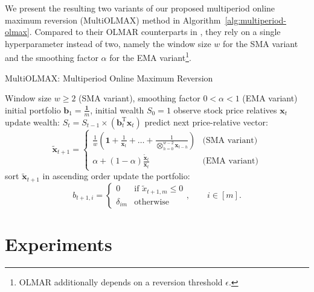 We present the resulting two variants of our proposed multiperiod online maximum reversion (MultiOLMAX) method in Algorithm~\ref{alg:multiperiod-olmax}. Compared to their OLMAR counterparts in \citep{olmar}, they rely on a single hyperparameter instead of two, namely the window size $w$ for the SMA variant and the smoothing factor $\alpha$ for the EMA variant\footnote{OLMAR additionally depends on a reversion threshold $\epsilon$.}.
\begin{algorithm}
  \caption{MultiOLMAX: Multiperiod Online Maximum Reversion}
\label{alg:multiperiod-olmax}
  \begin{algorithmic}[1]
     Window size $w \geq 2$ (SMA variant), smoothing factor $0 < \alpha < 1$ (EMA variant)
     initial portfolio $\mathbf{b}_1 = \frac{\mathbf{1}}{m}$, initial wealth $S_0 = 1$
      \STATE observe stock price relatives $\mathbf{x}_t$
      \STATE update wealth:
        $
          S_t = S_{t-1} \times (\mathbf{b}_t^\text{T}\mathbf{x}_t)
        $
      	\STATE predict next price-relative vector:
	\begin{equation*}
		\widetilde{\mathbf{x}}_{t+1} =
		\begin{cases}
			\frac{1}{w}\left(\mathbf{1} + \frac{1}{\mathbf{x}_t} + \ldots + \frac{1}{\bigotimes_{h=0}^{w-2}\mathbf{x}_{t-h}}\right) & \text{(SMA variant)} \\
			\alpha + (1-\alpha)\frac{\widetilde{\mathbf{x}}_{t}}{\mathbf{x}_t} & \text{(EMA variant)}
		\end{cases}
	\end{equation*}
        \STATE sort $\widetilde{\mathbf{x}}_{t+1}$ in ascending order 
      \STATE update the portfolio:
	\begin{equation*}
		b_{t+1,i} =
	\begin{cases}
		0 & \text{if } \widetilde{x}_{t+1,m} \leq 0 \\
		\delta_{im} & \text{otherwise}
	\end{cases},
	\qquad i \in [m].
	\end{equation*}
	\ENDIF
    \ENDFOR
  \end{algorithmic}
\end{algorithm}


\section{Experiments}
\label{sec:experiments}

